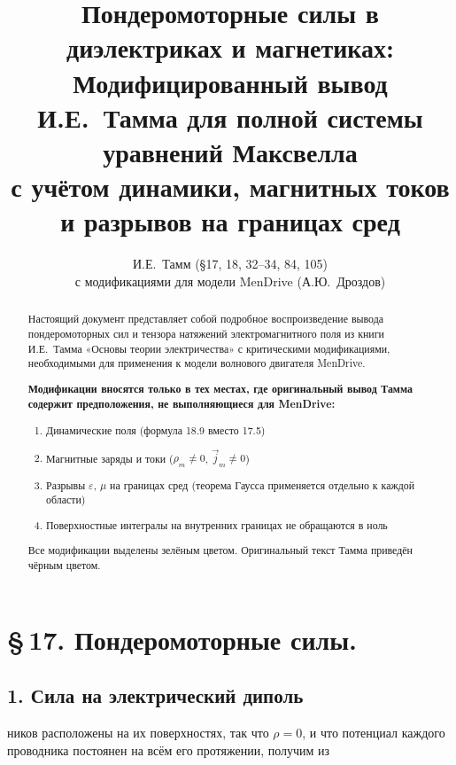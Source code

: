 \documentclass[a4paper,12pt]{article}
\title{Пондеромоторные силы в диэлектриках и магнетиках:\\
Модифицированный вывод И.Е.~Тамма для полной системы уравнений Максвелла\\
с учётом динамики, магнитных токов и разрывов на границах сред}
\author{И.Е.~Тамм (\S 17, 18, 32--34, 84, 105)\\
с модификациями для модели MenDrive (А.Ю.~Дроздов)}
\date{}
\newcommand{\modtext}[1]{\textcolor{modcolor}{#1}}
\begin{document}
\maketitle

\begin{abstract}
Настоящий документ представляет собой подробное воспроизведение вывода пондеромоторных
сил и тензора натяжений электромагнитного поля из книги И.Е.~Тамма «Основы теории
электричества» с критическими модификациями, необходимыми для применения к модели
волнового двигателя MenDrive.

\modtext{
    \textbf{Модификации вносятся только в тех местах, где оригинальный вывод Тамма
    содержит предположения, не выполняющиеся для MenDrive:}
    \begin{enumerate}
        \item Динамические поля (формула 18.9 вместо 17.5)
        \item Магнитные заряды и токи ($\rho_m \neq 0$, $\vec{j}_m \neq 0$)
        \item Разрывы $\varepsilon$, $\mu$ на границах сред (теорема Гаусса применяется
        отдельно к каждой области)
        \item Поверхностные интегралы на внутренних границах не обращаются в ноль
    \end{enumerate}
}

Все модификации выделены \textcolor{modcolor}{зелёным цветом}. Оригинальный текст
Тамма приведён чёрным цветом.
\end{abstract}

\tableofcontents

\newpage


\section*{\S\,17. Пондеромоторные силы.}

\subsection*{1. Сила на электрический диполь}

\noindent
ников расположены на их поверхностях, так что $\rho = 0$, и что
потенциал каждого проводника постоянен на всём его протяжении,
получим из
\end{document}
